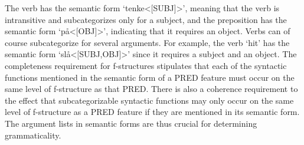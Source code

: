 \documentclass[output=paper]{langsci/langscibook}
\begin{document}
The\ili{} verb\ili{} has\ili{} the\ili{} semantic\ili{} form\ili{} \ili{}`tenke\ili{}<\ili{}[SUBJ\ili{}]\ili{}>\ili{}'\ili{},\ili{} meaning\ili{} that\ili{} the\ili{} verb\ili{} is\ili{} intransitive\ili{} and\ili{} subcategorizes\ili{} only\ili{} for\ili{} a\ili{} subject\ili{},\ili{} and\ili{} the\ili{} preposition\ili{} has\ili{} the\ili{} semantic\ili{} form\ili{} \ili{}`på\ili{}<\ili{}[OBJ\ili{}]\ili{}>\ili{}'\ili{},\ili{} indicating\ili{} that\ili{} it\ili{} requires\ili{} an\ili{} object\ili{}.\ili{}
\ili{}%
\ili{}
Verbs\ili{} can\ili{} of\ili{} course\ili{} subcategorize\ili{} for\ili{} several\ili{} arguments\ili{}.\ili{}
For\ili{} example\ili{},\ili{} the\ili{} verb\ili{} \ili{}\textit{}\ili{} \ili{}`hit\ili{}'\ili{} has\ili{} the\ili{} semantic\ili{} form\ili{} \ili{}`slå\ili{}<\ili{}[SUBJ\ili{},OBJ\ili{}]\ili{}>\ili{}'\ili{} since\ili{} it\ili{} requires\ili{} a\ili{} subject\ili{} and\ili{} an\ili{} object\ili{}.\ili{}
The\ili{} completeness\ili{} requirement\ili{} for\ili{} f\ili{}-structures\ili{} stipulates\ili{} that\ili{} each\ili{} of\ili{} the\ili{} syntactic\ili{} functions\ili{} mentioned\ili{} in\ili{} the\ili{} semantic\ili{} form\ili{} of\ili{} a\ili{} PRED\ili{} feature\ili{} must\ili{} occur\ili{} on\ili{} the\ili{} same\ili{} level\ili{} of\ili{} f\ili{}-structure\ili{} as\ili{} that\ili{} PRED\ili{}.\ili{}
There\ili{} is\ili{} also\ili{} a\ili{} coherence\ili{} requirement\ili{} to\ili{} the\ili{} effect\ili{} that\ili{} subcategorizable\ili{} syntactic\ili{} functions\ili{} may\ili{} only\ili{} occur\ili{} on\ili{} the\ili{} same\ili{} level\ili{} of\ili{} f\ili{}-structure\ili{} as\ili{} a\ili{} PRED\ili{} feature\ili{} if\ili{} they\ili{} are\ili{} mentioned\ili{} in\ili{} its\ili{} semantic\ili{} form\ili{}.\ili{}
The\ili{} argument\ili{} lists\ili{} in\ili{} semantic\ili{} forms\ili{} are\ili{} thus\ili{} crucial\ili{} for\ili{} determining\ili{} grammaticality\ili{}.\ili{}
\end{document}
